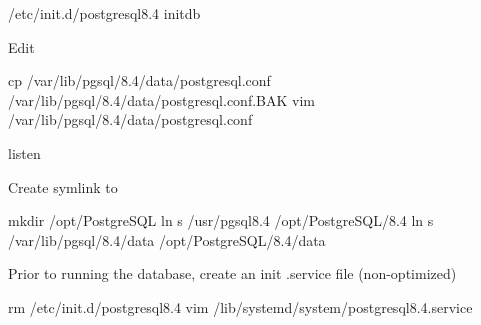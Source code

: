 \documentclass[letterpaper,10pt,english]{sphinxmanual}
\begin{document}
%
\begin{sphinxVerbatim}[commandchars=\\\{\}]
/etc/init.d/postgresql\PYGZhy{}8.4 initdb
\end{sphinxVerbatim}

Edit 

%
\begin{sphinxVerbatim}[commandchars=\\\{\}]
cp /var/lib/pgsql/8.4/data/postgresql.conf /var/lib/pgsql/8.4/data/postgresql.conf.BAK
vim /var/lib/pgsql/8.4/data/postgresql.conf
\end{sphinxVerbatim}

%
\begin{sphinxVerbatim}[commandchars=\\\{\}]
listen   
  
\end{sphinxVerbatim}

Create symlink to 

%
\begin{sphinxVerbatim}[commandchars=\\\{\}]
mkdir /opt/PostgreSQL
ln \PYGZhy{}s /usr/pgsql\PYGZhy{}8.4 /opt/PostgreSQL/8.4
ln \PYGZhy{}s /var/lib/pgsql/8.4/data /opt/PostgreSQL/8.4/data
\end{sphinxVerbatim}

Prior to running the database, create an init .service file (non-optimized)

%
\begin{sphinxVerbatim}[commandchars=\\\{\}]
rm /etc/init.d/postgresql\PYGZhy{}8.4
vim /lib/systemd/system/postgresql\PYGZhy{}8.4.service
\end{sphinxVerbatim}
\end{document}
